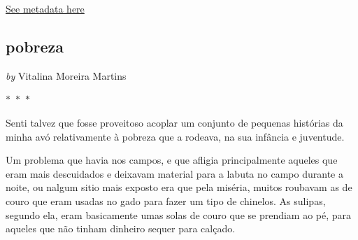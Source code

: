 
\hyperref[table:\arabic{tablecounter}]{See metadata here}

\newpage

\begin{center}

    \section{  pobreza  }

    
            
                \textit{by} Vitalina Moreira Martins
            
        

     
    
    

$\ast$~$\ast$~$\ast$



\end{center}

\begin{center}
    \begin{minipage}{0.9\textwidth}
        \setlength{\parskip}{0.2cm}
        \setlength{\parindent}{0cm}
        \fontsize{12pt}{14pt}\selectfont
        


Senti talvez que fosse proveitoso acoplar um conjunto de pequenas
histórias da minha avó relativamente à pobreza que a rodeava, na sua
infância e juventude.

Um problema que havia nos campos, e que afligia principalmente aqueles
que eram mais descuidados e deixavam material para a labuta no campo
durante a noite, ou nalgum sitio mais exposto era que pela miséria,
muitos roubavam as de couro que eram usadas no gado para fazer um tipo de chinelos. As
sulipas, segundo ela, eram basicamente umas solas de couro que se
prendiam ao pé, para aqueles que não tinham dinheiro sequer para
calçado.

    \end{minipage}
\end{center}

